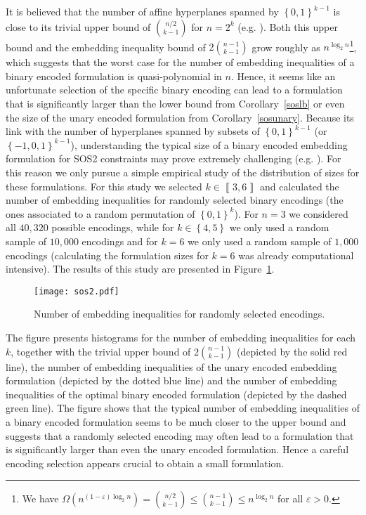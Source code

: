 \documentclass[mnsc]{informs3}
\newcommand{\set}[1]{\left\{#1\right\}}                     %
\newcommand{\bra}[1]{\left(#1\right)}
\newcommand{\sidx}[1]{\left\llbracket     #1 \right\rrbracket}
\begin{document}
It is believed that the number of affine hyperplanes spanned by $\set{0,1}^{k-1}$ is close to its trivial upper bound of $\binom{n/2}{k-1}$ for $n=2^k$ (e.g. \cite{aichholzer1996classifying}). Both this upper bound and the embedding inequality bound of $2\binom{n-1}{k-1}$ grow roughly as $n^{\log_2n}$\footnote{We have $\Omega\bra{n^{(1-\varepsilon) \log_2 n}}=\binom{n/2}{k-1}\leq \binom{n-1}{k-1}\leq n^{\log_2 n}$ for all $\varepsilon>0$.}, which suggests that the worst case for the number of embedding inequalities of a binary encoded formulation is quasi-polynomial in $n$. 
Hence, it seems like an unfortunate selection of the specific binary encoding can lead to a formulation that is significantly larger than the lower bound from Corollary~\ref{soslb} or even the size of the unary encoded formulation from Corollary~\ref{sosunary}. Because its link with the number of hyperplanes spanned by subsets of $\set{0,1}^{k-1}$ (or $\set{-1,0,1}^{k-1}$), understanding the typical size of a binary encoded embedding formulation for SOS2 constraints may prove extremely challenging (e.g. \cite{voigt2006singular}). For this reason we only pursue a simple empirical study of the distribution of sizes for these formulations. For this study we selected $k\in \sidx{3,6}$ and calculated the number of embedding inequalities for randomly selected binary encodings (the ones associated to a random permutation of $\set{0,1}^{k}$). For $n=3$ we considered all $40,320$ possible encodings, while for $k\in \set{4,5}$ we only used a random sample of $10,000$ encodings and for $k=6$ we only used a random sample of $1,000$ encodings (calculating the formulation sizes for $k=6$ was already computational intensive). The results of this study are presented in Figure~\ref{randomfigure}.
\begin{figure}[htpb]
  \begin{center}
  \texttt{[image: sos2.pdf]}
  \end{center}
  \caption{Number of embedding inequalities for randomly selected encodings.}\label{randomfigure}
  \end{figure}
 The figure presents histograms for the number of embedding inequalities  for each $k$, together with the trivial upper bound of $2 \binom{n-1}{k-1}$ (depicted by the solid red line), the number of embedding inequalities of the unary encoded embedding formulation (depicted by the dotted blue line) and the number of embedding inequalities of the optimal binary encoded formulation (depicted by the dashed green line). The figure shows that the typical number of embedding inequalities of a binary encoded formulation seems to be much closer to the upper bound and suggests that a randomly selected encoding may often lead to a formulation that is significantly larger than even the unary encoded formulation. Hence a careful encoding selection appears crucial to obtain a small formulation.
\end{document}
